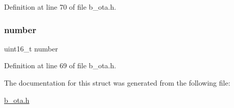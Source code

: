 Definition at line 70 of file b\+\_\+ota.\+h.

\mbox{\label{structb_o_t_a___f_w_data__t_adf69c46b3dd2878c66bab78eddc40b04}} 
\subsubsection{\texorpdfstring{number}{number}}
{\footnotesize\ttfamily uint16\+\_\+t number}



Definition at line 69 of file b\+\_\+ota.\+h.



The documentation for this struct was generated from the following file\+:\begin{DoxyCompactItemize}
\item 
\mbox{\hyperlink{b__ota_8h}{b\+\_\+ota.\+h}}\end{DoxyCompactItemize}
